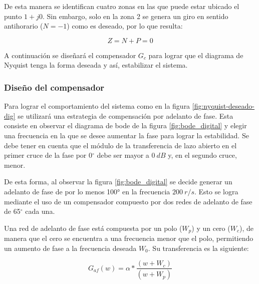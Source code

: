 De esta manera se identifican cuatro zonas en las que puede estar ubicado el punto $1+j0$. Sin embargo, solo en la zona 2 se genera un giro en sentido antihorario ($N=-1$) como es deseado, por lo que resulta:

\begin{equation*}
	Z = N + P = 0
\end{equation*}


A continuación se diseñará el compensador $G_c$ para lograr que el diagrama de Nyquist tenga la forma deseada y así, estabilizar el sistema.

\subsubsection{Diseño del compensador}

Para lograr el comportamiento del sistema como en la figura 	\ref{fig:nyquist-deseado-dig} se utilizará una estrategia de compensación por adelanto de fase. Esta consiste en observar el diagrama de bode de la figura \ref{fig:bode_digital} y elegir una frecuencia en la que se desee aumentar la fase para lograr la estabilidad. Se debe tener en cuenta que el módulo de la transferencia de lazo abierto en el primer cruce de la fase por 0$\mathrm{{}^\circ}$ debe ser mayor a $0\:dB$ y, en el segundo cruce, menor. 

De esta forma, al observar la figura \ref{fig:bode_digital} se decide generar un adelanto de fase de por lo menos 100° en la frecuencia $200\:r/s$. Esto se logra mediante el uso de un compensador compuesto por dos redes de adelanto de fase de 65$\mathrm{{}^\circ}$ cada una. 

Una red de adelanto de fase está compuesta por un polo ($W_p$) y un cero ($W_c$), de manera que el cero se encuentra a una frecuencia menor que el polo, permitiendo un aumento de fase a la frecuencia deseada $W_0$. Su transferencia es la siguiente:

\begin{equation} \label{eq_tf_adelanto_dig}
	G_{af}(w)=\alpha*\frac{(w + W_c)}{(w + W_p)}
\end{equation}

